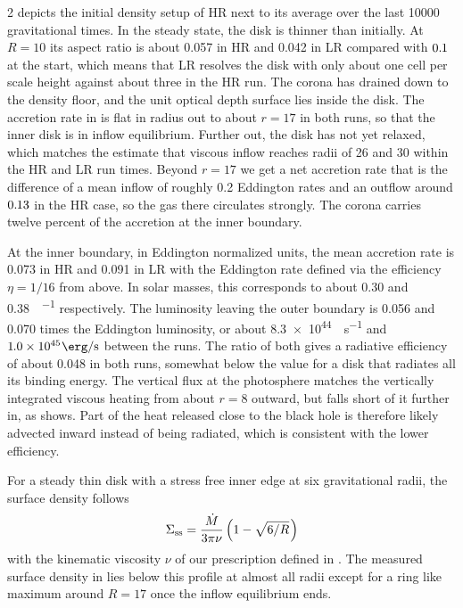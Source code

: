 \begin{multicols}{2}
	 depicts the initial density setup of HR next to its average over the last \num{10000}
	gravitational times. In the steady state, the disk is thinner than initially. At $R = 10$ its aspect ratio is about \num{0.057}
	in HR and \num{0.042} in LR compared with $0.{\kern-0.5pt}1$ at the start, which means that LR resolves the disk with only about one cell
	per scale height against about three in the HR run. The corona has drained down to the density floor, and the unit optical depth
	surface lies inside the disk. The accretion rate in  is flat in radius out to about $r = 17$
	in both runs, so that the inner disk is in inflow equilibrium. Further out, the disk has not yet relaxed, which matches the
	estimate that viscous inflow reaches radii of \num{26} and \num{30} within the HR and LR run times. Beyond $r = 17$ we get a
	net accretion rate that is the difference of a mean inflow of roughly \num{0.2} Eddington rates and an outflow around $0.{\kern-0.5pt}13$
	in the HR case, so the gas there circulates strongly. The corona carries twelve percent of the accretion at the inner boundary.


	At the inner boundary, in Eddington normalized units, the mean accretion rate is \num{0.073} in HR and \num{0.091} in LR with the
	Eddington rate defined via the efficiency $\eta = 1/16$ from above. In solar masses, this corresponds to about \num{0.30} and
	\qty{0.38}{\solarmass\per\year} respectively. The luminosity leaving the outer boundary is \num{0.056} and \num{0.070} times
	the Eddington luminosity, or about \qty{8.3e44}{\erg\per\second} and $1{\kern-0.5pt}.0\times 10^{45}\kern+0.5pt\unit{\erg\per\second}$
	between the runs. The ratio of both gives a radiative efficiency of about \num{0.048} in both runs, somewhat below the value for a disk
	that radiates all its binding energy. The vertical flux at the photosphere matches the vertically integrated viscous heating from about
	$r = 8$ outward, but falls short of it further in, as  shows. Part of the heat released close to the
	black hole is therefore likely advected inward instead of being radiated, which is consistent with the lower efficiency.

	For a steady thin disk with a stress free inner edge at six gravitational radii, the surface density follows
	\begin{equation}
		\Sigma_\mathrm{ss} = \frac{\dot M}{3\pi\nu} \left(1 - \sqrt{6 / R}\kern+1pt\right)
		\label{eq:sigma}
	\end{equation}
	with the kinematic viscosity $\nu$ of our prescription defined in . The measured surface density in
	 lies below this profile at almost all radii except for a ring like maximum around $R = 17$ once the inflow
	equilibrium ends.


\end{multicols}
